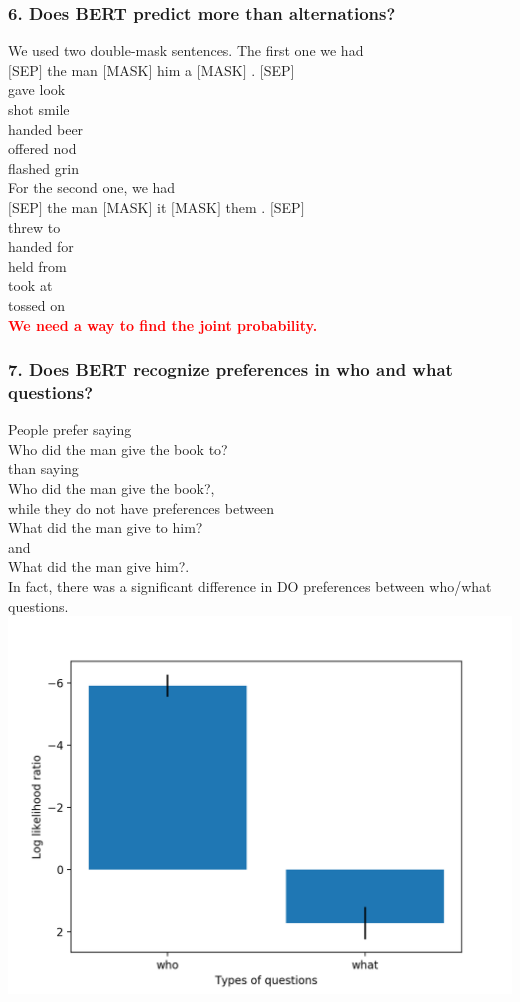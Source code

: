 \documentclass[twocolumn,dvipdfmx, 10pt]{article}
\begin{document}
\subsubsection*{6. Does BERT predict more than alternations?}
We used two double-mask sentences.  The first one we had \\
$[$SEP$]$ the man $[$MASK$]$ him a $[$MASK$]$ . $[$SEP$]$\\
gave	look\\
shot	smile\\
handed	beer\\
offered	nod\\
flashed	grin\\
For the second one, we had\\
$[$SEP$]$ the man $[$MASK$]$ it $[$MASK$]$ them . $[$SEP$]$\\
threw	to\\
handed	for\\
held	from\\
took	at\\
tossed	on\\
\textcolor{red}{\textbf{We need a way to find the joint probability.}}
\subsubsection*{7. Does BERT recognize preferences in who and what questions?}
People prefer saying\\
Who did the man give the book to?\\
than saying\\
Who did the man give the book?,\\
while they do not have preferences between\\
What did the man give to him?\\
and\\
What did the man give him?.\\
In fact, there was a significant difference in DO preferences between who/what questions.\\
\includegraphics[keepaspectratio,width = \linewidth]{question_new.png}
\end{document}

